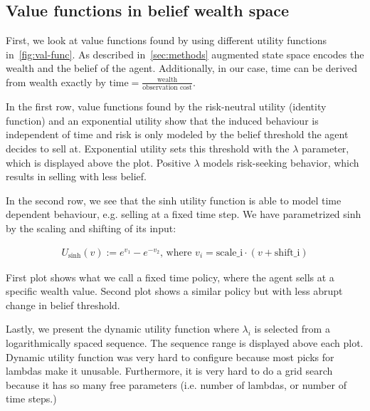 \subsection{Value functions in belief wealth space}\label{ssec:val-func}

First, we look at value functions found by using different utility functions in~\autoref{fig:val-func}.
As described in~\autoref{sec:methods} augmented state space encodes the wealth and the belief of the agent. 
Additionally, in our case, time can be derived from wealth exactly by $\text{time} = \frac{\text{wealth}}{\text{observation\ cost}}$.

In the first row, value functions found by the risk-neutral utility (identity function) and an exponential utility show that the induced behaviour is independent of time and risk is only modeled by the belief threshold the agent decides to sell at.
Exponential utility sets this threshold with the $\lambda$ parameter, which is displayed above the plot.
Positive $\lambda$ models risk-seeking behavior, which results in selling with less belief.

In the second row, we see that the sinh utility function is able to model time dependent behaviour, e.g. selling at a fixed time step. We have parametrized sinh by the scaling and shifting of its input:

\begin{align*}
    U_\text{sinh}(v) := e^{v_1} - e^{-v_2} \text{, where\ } v_i = \text{scale_i}\cdot(v+\text{shift_i})
\end{align*}

First plot shows what we call a fixed time policy, where the agent sells at a specific wealth value.
Second plot shows a similar policy but with less abrupt change in belief threshold.

Lastly, we present the dynamic utility function where $\lambda_i$ is selected from a logarithmically spaced sequence. The sequence range is displayed above each plot. Dynamic utility function was very hard to configure because most picks for lambdas make it unusable. Furthermore, it is very hard to do a grid search because it has so many free parameters (i.e. number of lambdas, or number of time steps.)


